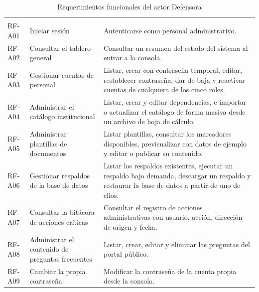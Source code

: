 	\begin{longtable}{|p{1.5cm}|p{3.6cm}|p{9.0cm}|}
		\caption{Requerimientos funcionales del actor Defensora}
		\label{tab:rf_admin} \\
		\hline
		\rowcolor{headerblue}
		\headercell{ID} & \headercell{Requerimiento} & \headercell{Descripción} \\
		\hline
		\endfirsthead
	
		\hline
		\rowcolor{headerblue}
		\headercell{ID} & \headercell{Requerimiento} & \headercell{Descripción} \\
		\hline
		\endhead
	
		RF-A01 & Iniciar sesión & Autenticarse como personal administrativo. \\ \hline
	
		RF-A02 & Consultar el tablero general & Consultar un resumen del estado del sistema al
		entrar a la consola. \\ \hline
	
		RF-A03 & Gestionar cuentas de personal & Listar, crear con contraseña temporal, editar,
		restablecer contraseña, dar de baja y reactivar cuentas de cualquiera de los cinco roles.
		\\ \hline
	
		RF-A04 & Administrar el catálogo institucional & Listar, crear y editar dependencias, e
		importar o actualizar el catálogo de forma masiva desde un archivo de hoja de cálculo.
		\\ \hline
	
		RF-A05 & Administrar plantillas de documentos & Listar plantillas, consultar los marcadores
		disponibles, previsualizar con datos de ejemplo y editar o publicar su contenido. \\ \hline
	
		RF-A06 & Gestionar respaldos de la base de datos & Listar los respaldos existentes, ejecutar
		un respaldo bajo demanda, descargar un respaldo y restaurar la base de datos a partir de uno
		de ellos. \\ \hline
	
		RF-A07 & Consultar la bitácora de acciones críticas & Consultar el registro de acciones
		administrativas con usuario, acción, dirección de origen y fecha. \\ \hline
	
		RF-A08 & Administrar el contenido de preguntas frecuentes & Listar, crear, editar y eliminar
		las preguntas del portal público. \\ \hline
	
		RF-A09 & Cambiar la propia contraseña & Modificar la contraseña de la cuenta propia desde la
		consola. \\ \hline
	\end{longtable}
	
